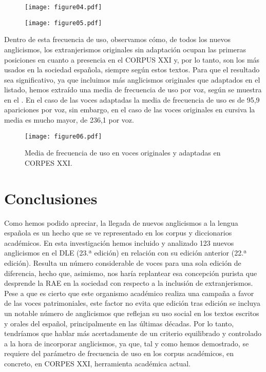 \documentclass{textolivre}
\begin{document}
\begin{figure}[htbp]
\begin{minipage}{0.47\textwidth}
\texttt{[image: figure04.pdf]}
\label{fig-04}
\end{minipage}
\hfill
\begin{minipage}{0.47\textwidth}
\texttt{[image: figure05.pdf]}
\label{fig-05}
\end{minipage}
\caption{ }
\label{fig-diezvoces}
\end{figure}

Dentro de esta frecuencia de uso, observamos cómo, de todos los nuevos anglicismos, los extranjerismos originales sin adaptación ocupan las primeras posiciones en cuanto a presencia en el CORPUS XXI y, por lo tanto, son los más usados en la sociedad española, siempre según estos textos. Para que el resultado sea significativo, ya que incluimos más anglicismos originales que adaptados en el listado, hemos extraído una media de frecuencia de uso por voz, según se muestra en el . En el caso de las voces adaptadas la media de frecuencia de uso es de 95,9 apariciones por voz, sin embargo, en el caso de las voces originales en cursiva la media es mucho mayor, de 236,1 por voz.

\begin{figure}[htbp]
 \centering
 \texttt{[image: figure06.pdf]}
 \caption{Media de frecuencia de uso en voces originales y adaptadas en CORPES XXI.}
 \label{fig-06}
\end{figure}



\section{Conclusiones}\label{sec-conclusiones}
Como hemos podido apreciar, la llegada de nuevos anglicismos a la lengua española es un hecho que se ve representado en los corpus y diccionarios académicos. En esta investigación hemos incluido y analizado 123 nuevos anglicismos en el DLE (23.ª edición) en relación con su edición anterior (22.ª edición). Resulta un número considerable de voces para una sola edición de diferencia, hecho que, asimismo, nos haría replantear esa concepción purista que desprende la RAE en la sociedad con respecto a la inclusión de extranjerismos. Pese a que es cierto que este organismo académico realiza una campaña a favor de las voces patrimoniales, este factor no evita que edición tras edición se incluya un notable número de anglicismos que reflejan su uso social en los textos escritos y orales del español, principalmente en las últimas décadas. Por lo tanto, tendríamos que hablar más acertadamente de un criterio equilibrado y controlado a la hora de incorporar anglicismos, ya que, tal y como hemos demostrado, se requiere del parámetro de frecuencia de uso en los corpus académicos, en concreto, en CORPES XXI, herramienta académica actual.
\end{document}
